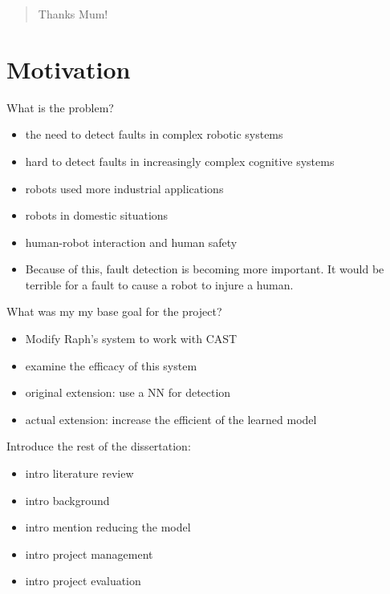 \documentclass[11pt, a4paper]{report}
\begin{document}
\renewcommand{\abstractname}{Acknowledgments}
\begin{abstract}
  Thanks Mum!
\end{abstract}

\chapter{Motivation}
\label{cha:motivation}


What is the problem?
\begin{itemize}
\item the need to detect faults in complex robotic systems
\item hard to detect faults in increasingly complex cognitive systems
\item robots used more industrial applications
\item robots in domestic situations
\item human-robot interaction and human safety
\item Because of this, fault detection is becoming more important. It
  would be terrible for a fault to cause a robot to injure a human.
\end{itemize}

What was my my base goal for the project?
\begin{itemize}
\item Modify Raph's system to work with CAST
\item examine the efficacy of this system
\item original extension: use a NN for detection
\item actual extension: increase the efficient of the learned model
\end{itemize}

Introduce the rest of the dissertation:
\begin{itemize}
\item intro literature review
\item intro background
\item intro mention reducing the model
\item intro project management
\item intro project evaluation
\end{itemize}
\end{document}
